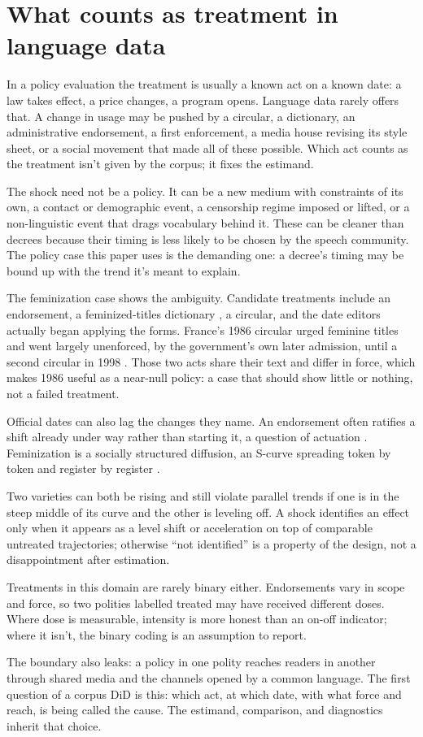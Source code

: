 \section{What counts as treatment in language data}
\label{sec:treatments}

In a policy evaluation the treatment is usually a known act on a known date: a law takes effect, a price changes, a program opens. Language data rarely offers that. A change in usage may be pushed by a circular, a dictionary, an administrative endorsement, a first enforcement, a media house revising its style sheet, or a social movement that made all of these possible. Which act counts as the treatment isn't given by the corpus; it fixes the estimand.

The shock need not be a policy. It can be a new medium with constraints of its own, a contact or demographic event, a censorship regime imposed or lifted, or a non-linguistic event that drags vocabulary behind it. These can be cleaner than decrees because their timing is less likely to be chosen by the speech community. The policy case this paper uses is the demanding one: a decree's timing may be bound up with the trend it's meant to explain.

The feminization case shows the ambiguity. Candidate treatments include an endorsement, a feminized-titles dictionary \citep{Moreau1991}, a circular, and the date editors actually began applying the forms. France's 1986 circular \citep{france1986circ} urged feminine titles and went largely unenforced, by the government's own later admission, until a second circular in 1998 \citep{france1998circ,BurnettBonami2019}. Those two acts share their text and differ in force, which makes 1986 useful as a near-null policy: a case that should show little or nothing, not a failed treatment.

Official dates can also lag the changes they name. An endorsement often ratifies a shift already under way rather than starting it, a question of actuation \citep{BurnettBonami2019}. Feminization is a socially structured diffusion, an S-curve spreading token by token and register by register \citep{weinreich1968,tagliamontedarcy2007}.

Two varieties can both be rising and still violate parallel trends if one is in the steep middle of its curve and the other is leveling off. A shock identifies an effect only when it appears as a level shift or acceleration on top of comparable untreated trajectories; otherwise \enquote{not identified} is a property of the design, not a disappointment after estimation.

Treatments in this domain are rarely binary either. Endorsements vary in scope and force, so two polities labelled treated may have received different doses. Where dose is measurable, intensity is more honest than an on-off indicator; where it isn't, the binary coding is an assumption to report.

The boundary also leaks: a policy in one polity reaches readers in another through shared media and the channels opened by a common language. The first question of a corpus DiD is this: which act, at which date, with what force and reach, is being called the cause. The estimand, comparison, and diagnostics inherit that choice.
